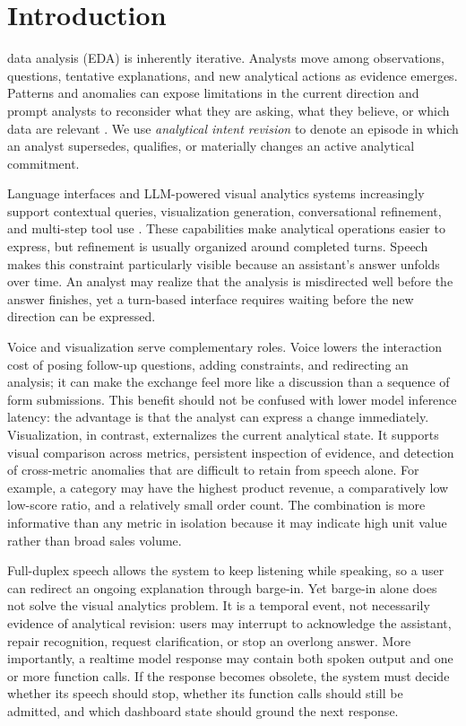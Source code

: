 \documentclass[journal]{IEEEtran}
\begin{document}
\section{Introduction}
\label{sec:intro}

 data analysis (EDA) is inherently iterative. Analysts move among observations, questions, tentative explanations, and new analytical actions as evidence emerges. Patterns and anomalies can expose limitations in the current direction and prompt analysts to reconsider what they are asking, what they believe, or which data are relevant \cite{russell1993cost,pirolli2005sensemaking,sacha2014knowledge,battle2019characterizing}. We use \emph{analytical intent revision} to denote an episode in which an analyst supersedes, qualifies, or materially changes an active analytical commitment.

Language interfaces and LLM-powered visual analytics systems increasingly support contextual queries, visualization generation, conversational refinement, and multi-step tool use \cite{gao2015datatone,setlur2016eviza,narechania2021nl4dv,dibia2023lida,wang2024dataformulator2,zhao2024lightva}. These capabilities make analytical operations easier to express, but refinement is usually organized around completed turns. Speech makes this constraint particularly visible because an assistant's answer unfolds over time. An analyst may realize that the analysis is misdirected well before the answer finishes, yet a turn-based interface requires waiting before the new direction can be expressed.

Voice and visualization serve complementary roles. Voice lowers the interaction cost of posing follow-up questions, adding constraints, and redirecting an analysis; it can make the exchange feel more like a discussion than a sequence of form submissions. This benefit should not be confused with lower model inference latency: the advantage is that the analyst can express a change immediately. Visualization, in contrast, externalizes the current analytical state. It supports visual comparison across metrics, persistent inspection of evidence, and detection of cross-metric anomalies that are difficult to retain from speech alone. For example, a category may have the highest product revenue, a comparatively low low-score ratio, and a relatively small order count. The combination is more informative than any metric in isolation because it may indicate high unit value rather than broad sales volume.

Full-duplex speech allows the system to keep listening while speaking, so a user can redirect an ongoing explanation through barge-in. Yet barge-in alone does not solve the visual analytics problem. It is a temporal event, not necessarily evidence of analytical revision: users may interrupt to acknowledge the assistant, repair recognition, request clarification, or stop an overlong answer. More importantly, a realtime model response may contain both spoken output and one or more function calls. If the response becomes obsolete, the system must decide whether its speech should stop, whether its function calls should still be admitted, and which dashboard state should ground the next response.
\end{document}
